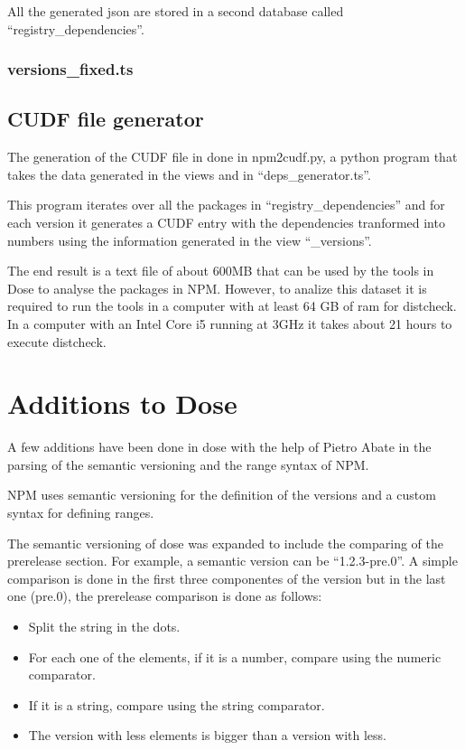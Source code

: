 \documentclass[letterpaper,12pt]{report}
\begin{document}
All the generated json are stored in a second database called
``registry\_dependencies''.



\subsubsection{versions\_fixed.ts}


\subsection{CUDF file generator}

The generation of the CUDF file in done in npm2cudf.py, a python program that
takes the data generated in the views and in ``deps\_generator.ts''.

This program iterates over all the packages in ``registry\_dependencies'' and
for each version it generates a CUDF entry with the dependencies tranformed into
numbers using the information generated in the view ``\_versions''.

The end result is a text file of about 600MB that can be used by the tools in
Dose to analyse the packages in NPM. However, to analize this dataset it is
required to run the tools in a computer with at least 64 GB of ram for
distcheck. In a computer with an Intel Core i5 running at 3GHz it takes about 21
hours to execute distcheck.


\section{Additions to Dose}

A few additions have been done in dose with the help of Pietro Abate in the
parsing of the semantic versioning and the range syntax of NPM.

NPM uses semantic versioning for the definition of the versions and a custom
syntax for defining ranges.

The semantic versioning of dose was expanded to include the comparing of the
prerelease section. For example, a semantic version can be ``1.2.3-pre.0''. A
simple comparison is done in the first three componentes of the version but in
the last one (pre.0), the prerelease comparison is done as follows:

\begin{itemize}
  \item Split the string in the dots.
  \item For each one of the elements, if it is a number, compare using the
    numeric comparator.
  \item If it is a string, compare using the string comparator.
  \item The version with less elements is bigger than a version with less.
\end{itemize}
\end{document}
